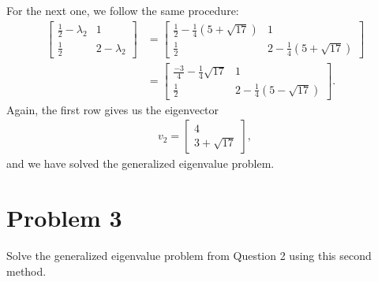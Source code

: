 \documentclass[10pt,a4paper]{article}
\theoremstyle{definition}
\begin{document}
For the next one, we follow the same procedure:
\begin{align*}
\begin{bmatrix}
\frac{1}{2} - \lambda_2 & 1\\
\frac{1}{2} & 2 - \lambda_2
\end{bmatrix} &= \begin{bmatrix} \frac{1}{2} - \frac{1}{4}(5 + \sqrt{17}) & 1\\
\frac{1}{2} & 2 - \frac{1}{4}(5 + \sqrt{17})
\end{bmatrix}\\
&= \begin{bmatrix} \frac{-3}{4} - \frac{1}{4}\sqrt{17} & 1\\
\frac{1}{2} & 2 - \frac{1}{4}(5 - \sqrt{17})
\end{bmatrix}.
\end{align*}
Again, the first row gives us the eigenvector
\begin{align*}
v_2 = \begin{bmatrix}
4\\
3 + \sqrt{17}
\end{bmatrix},
\end{align*}
and we have solved the generalized eigenvalue problem.

\section*{Problem 3}
Solve the generalized eigenvalue problem from Question 2 using this second method.
\end{document}
